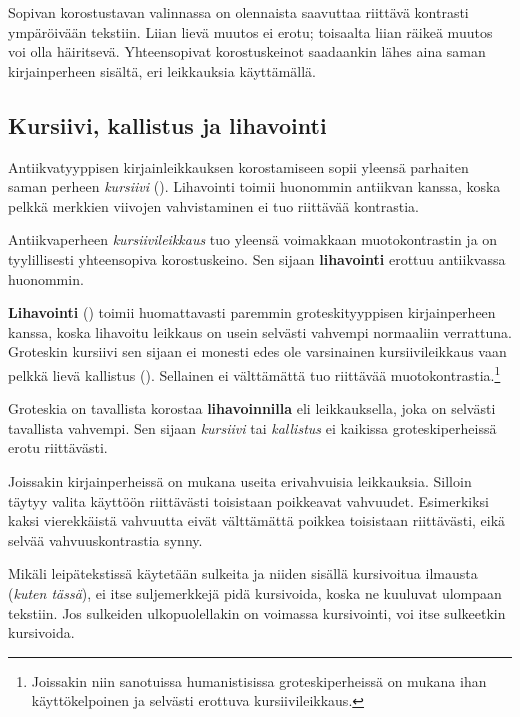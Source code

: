 Sopivan korostustavan valinnassa on olennaista saavuttaa riittävä
kontrasti ympäröivään tekstiin. Liian lievä muutos ei erotu; toisaalta
liian räikeä muutos voi olla häiritsevä. Yhteensopivat korostuskeinot
saadaankin lähes aina saman kirjainperheen sisältä, eri leikkauksia
käyttämällä.

\subsection{Kursiivi, kallistus ja lihavointi}
\label{luku/peruskorostukset}

Antiikvatyyppisen kirjainleikkauksen korostamiseen sopii yleensä
parhaiten saman perheen \textit{kursiivi} ().
Lihavointi toimii huonommin antiikvan kanssa, koska pelkkä merkkien
viivojen vahvistaminen ei tuo riittävää kontrastia.

\begin{tulossis}
  \rmfamily Antiikvaperheen \textit{kursiivileikkaus} tuo yleensä
  voimakkaan muotokontrastin ja on tyylillisesti yhteensopiva
  korostuskeino. Sen sijaan \textbf{lihavointi} erottuu antiikvassa
  huonommin.
\end{tulossis}

\textbf{Lihavointi} () toimii huomattavasti paremmin
groteskityyppisen kirjainperheen kanssa, koska lihavoitu leikkaus on
usein selvästi vahvempi normaaliin verrattuna. Groteskin kursiivi sen
sijaan ei monesti edes ole varsinainen kursiivileikkaus vaan pelkkä
lievä kallistus (). Sellainen ei välttämättä tuo
riittävää muotokontrastia.\footnote{Joissakin niin sanotuissa
  humanistisissa groteskiperheissä on mukana ihan käyttökelpoinen ja
  selvästi erottuva kursiivileikkaus.}

\begin{tulossis}
  \sffamily Groteskia on tavallista korostaa \textbf{lihavoinnilla} eli
  leikkauksella, joka on selvästi tavallista vahvempi. Sen sijaan
  \textit{kursiivi} tai \textsl{kallistus} ei kaikissa groteskiperheissä
  erotu riittävästi.
\end{tulossis}

Joissakin kirjainperheissä on mukana useita erivahvuisia leikkauksia.
Silloin täytyy valita käyttöön riittävästi toisistaan poikkeavat
vahvuudet. Esimerkiksi kaksi vierekkäistä vahvuutta eivät välttämättä
poikkea toisistaan riittävästi, eikä selvää vahvuuskontrastia synny.

Mikäli leipätekstissä käytetään sulkeita ja niiden sisällä kursivoitua
ilmausta (\textit{kuten tässä}), ei itse suljemerkkejä pidä kursivoida,
koska ne kuuluvat ulompaan tekstiin. Jos sulkeiden ulkopuolellakin on
voimassa kursivointi, voi itse sulkeetkin kursivoida.

